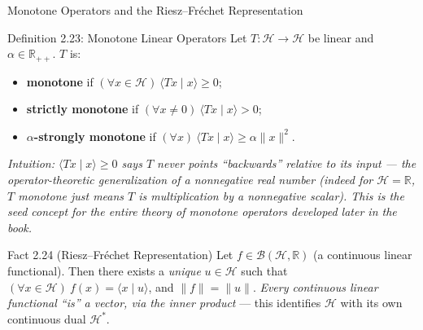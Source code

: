 \documentclass[aspectratio=169,10pt]{beamer}
\newcommand{\R}{\mathbb{R}}
\newcommand{\Hil}{\mathcal{H}}
\newcommand{\ip}[2]{\langle #1 \mid #2 \rangle}
\begin{document}
\begin{frame}{Monotone Operators and the Riesz--Fr\'echet Representation}
  \begin{block}{Definition 2.23: Monotone Linear Operators}
    Let $T:\Hil\to\Hil$ be linear and $\alpha\in\R_{++}$. $T$ is:
    \begin{itemize}
      \item \textbf{monotone} if $(\forall x\in\Hil)\ \ip{Tx}{x}\ge 0$;
      \item \textbf{strictly monotone} if $(\forall x\ne 0)\ \ip{Tx}{x}>0$;
      \item \textbf{$\alpha$-strongly monotone} if $(\forall x)\
        \ip{Tx}{x}\ge\alpha\|x\|^2$.
    \end{itemize}
    \textit{Intuition: $\ip{Tx}{x}\ge 0$ says $T$ never points ``backwards''
    relative to its input --- the operator-theoretic generalization of a
    nonnegative real number (indeed for $\Hil=\R$, $T$ monotone just means
    $T$ is multiplication by a nonnegative scalar). This is the seed
    concept for the entire theory of monotone operators developed later in
    the book.}
  \end{block}

  \begin{block}{Fact 2.24 (Riesz--Fr\'echet Representation)}
    Let $f\in\mathcal B(\Hil,\R)$ (a continuous linear functional). Then
    there exists a \emph{unique} $u\in\Hil$ such that $(\forall x\in\Hil)\
    f(x)=\ip{x}{u}$, and $\|f\|=\|u\|$. \textit{Every continuous linear
    functional ``is'' a vector, via the inner product} --- this identifies
    $\Hil$ with its own continuous dual $\Hil^*$.
  \end{block}
\end{frame}
\end{document}
